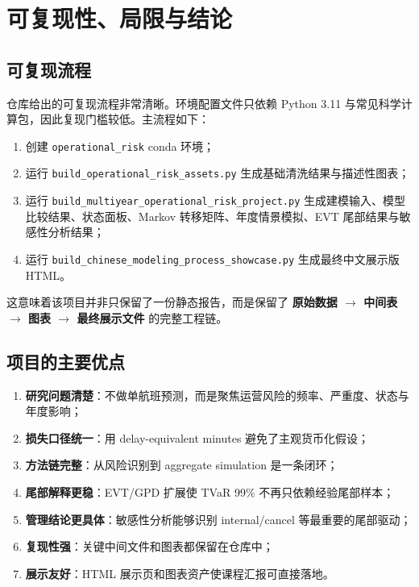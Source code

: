 \section{可复现性、局限与结论}

\subsection{可复现流程}

仓库给出的可复现流程非常清晰。环境配置文件只依赖 Python 3.11 与常见科学计算包，因此复现门槛较低。主流程如下：
\begin{enumerate}[leftmargin=2.2em]
  \item 创建 \texttt{operational\_risk} conda 环境；
  \item 运行 \texttt{build\_operational\_risk\_assets.py} 生成基础清洗结果与描述性图表；
  \item 运行 \texttt{build\_multiyear\_operational\_risk\_project.py} 生成建模输入、模型比较结果、状态面板、Markov 转移矩阵、年度情景模拟、EVT 尾部结果与敏感性分析结果；
  \item 运行 \texttt{build\_chinese\_modeling\_process\_showcase.py} 生成最终中文展示版 HTML。
\end{enumerate}

这意味着该项目并非只保留了一份静态报告，而是保留了 \textbf{原始数据 $\rightarrow$ 中间表 $\rightarrow$ 图表 $\rightarrow$ 最终展示文件} 的完整工程链。

\subsection{项目的主要优点}

\begin{enumerate}[leftmargin=2.2em]
  \item \textbf{研究问题清楚}：不做单航班预测，而是聚焦运营风险的频率、严重度、状态与年度影响；
  \item \textbf{损失口径统一}：用 delay-equivalent minutes 避免了主观货币化假设；
  \item \textbf{方法链完整}：从风险识别到 aggregate simulation 是一条闭环；
  \item \textbf{尾部解释更稳}：EVT/GPD 扩展使 TVaR 99\% 不再只依赖经验尾部样本；
  \item \textbf{管理结论更具体}：敏感性分析能够识别 internal/cancel 等最重要的尾部驱动；
  \item \textbf{复现性强}：关键中间文件和图表都保留在仓库中；
  \item \textbf{展示友好}：HTML 展示页和图表资产使课程汇报可直接落地。
\end{enumerate}

